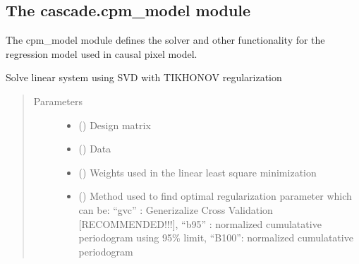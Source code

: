 \documentclass[a4paper,10pt,english]{sphinxmanual}
\begin{document}
\subsection{The cascade.cpm\_model module}
\label{\detokenize{cascade.cpm_model:module-cascade.cpm_model.cpm_model}}\label{\detokenize{cascade.cpm_model:the-cascade-cpm-model-module}}\label{\detokenize{cascade.cpm_model::doc}}
The cpm\_model module defines the solver and other functionality for the
regression model used in causal pixel model.

\begin{fulllineitems}
\label{\detokenize{cascade.cpm_model:cascade.cpm_model.cpm_model.solve_linear_equation}}
Solve linear system using SVD with TIKHONOV regularization
\begin{quote}\begin{description}
\item[{Parameters}] \leavevmode\begin{itemize}
\item {} 
 (\sphinxstyleliteralemphasis{\sphinxupquote{, }}) \textendash{} Design matrix

\item {} 
 () \textendash{} Data

\item {} 
 () \textendash{} Weights used in the linear least square minimization

\item {} 
 () \textendash{} Method used to find optimal regularization parameter which can be:
“gvc” :  Generizalize Cross Validation {[}RECOMMENDED!!!{]},
“b95” :  normalized cumulatative periodogram using 95\% limit,
“B100”:  normalized cumulatative periodogram


\end{itemize}
\end{description}
\end{quote}
\end{fulllineitems}
\end{document}
